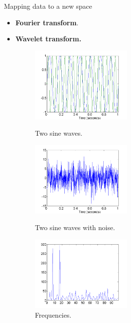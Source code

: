 \documentclass[aspectratio=169,t]{beamer}
\begin{document}
  { 
    \begin{frame}{Mapping data to a new space}
    \begin{itemize}
      \item \textbf{Fourier transform}.
      \item \textbf{Wavelet transform.}

    \begin{figure}
      \centering
      \begin{minipage}[b]{0.30\textwidth}
        \includegraphics[width=5cm]{img/twosinewaves.png}
        \caption{Two sine waves.}
      \end{minipage}\hfill
      \begin{minipage}[b]{0.30\textwidth}
        \includegraphics[width=5cm]{img/twosinewaveswithnoise.png}
        \caption{Two sine waves with noise.}
      \end{minipage}\hfill
      \begin{minipage}[b]{0.30\textwidth}
        \includegraphics[width=5cm]{img/frequencies.png}
        \caption{Frequencies.}
      \end{minipage}
    \end{figure}
    \end{itemize}
    \end{frame}
  }
\end{document}
